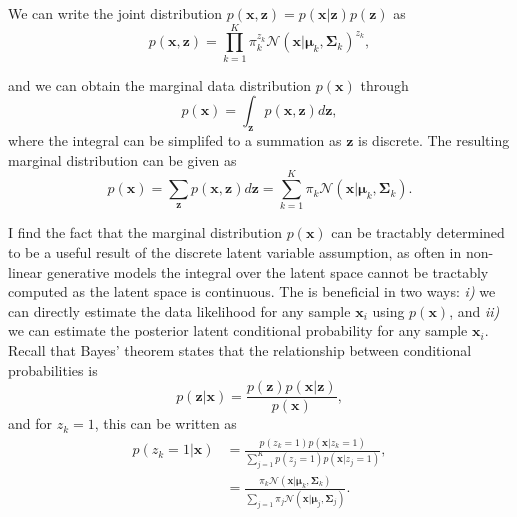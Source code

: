 \documentclass{article}
\begin{document}
We can write the joint distribution $p(\mathbf{x}, \mathbf{z}) = p(\mathbf{x}\vert\mathbf{z})p(\mathbf{z})$ as 
\begin{equation}\label{eq:joint_distribution}
p(\mathbf{x}, \mathbf{z}) = \prod_{k=1}^{K} \pi_k^{z_k} \mathcal{N}(\mathbf{x}\vert \boldsymbol\mu_k, \boldsymbol\Sigma_k)^{z_k},
\end{equation}

and we can obtain the marginal data distribution $p(\mathbf{x})$ through
\begin{equation}
p(\mathbf{x}) = \int_{\mathbf{z}}p(\mathbf{x}, \mathbf{z})d\mathbf{z},
\end{equation}
where the integral can be simplifed to a summation as $\mathbf{z}$ is discrete. The resulting marginal distribution can be given as
\begin{equation}
p(\mathbf{x}) = \sum_{\mathbf{z}}p(\mathbf{x}, \mathbf{z})d\mathbf{z} = \sum_{k=1}^{K} \pi_k \mathcal{N}(\mathbf{x}\vert \boldsymbol\mu_k, \boldsymbol\Sigma_k).
\end{equation}

I find the fact that the marginal distribution $p(\mathbf{x})$ can be tractably determined to be a useful result of the discrete latent variable assumption, as often in non-linear generative models the integral over the latent space cannot be tractably computed as the latent space is continuous. The is beneficial in two ways: \emph{i)} we can directly estimate the data likelihood for any sample $\mathbf{x}_i$ using $p(\mathbf{x})$, and \emph{ii)} we can estimate the posterior latent conditional probability for any sample $\mathbf{x}_i$. Recall that Bayes' theorem states that the relationship between conditional probabilities is
\begin{equation}\label{eq:posterior_distribution}
p(\mathbf{z} \vert \mathbf{x}) = \frac{p(\mathbf{z})p(\mathbf{x}\vert \mathbf{z})}{p(\mathbf{x})},
\end{equation}
and for $z_k = 1$, this can be written as
\begin{equation}
\begin{aligned}
p(z_k = 1 \vert \mathbf{x}) &= \frac{p(z_k = 1)p(\mathbf{x}\vert z_k = 1)}{\sum_{j=1}^{K}p(z_j = 1)p(\mathbf{x}\vert z_j = 1)}, \\
&= \frac{\pi_k\mathcal{N}(\mathbf{x}\vert \boldsymbol\mu_k, \boldsymbol\Sigma_k)}{\sum_{j=1}\pi_j\mathcal{N}(\mathbf{x}\vert \boldsymbol\mu_j, \boldsymbol\Sigma_j)}. \\
\end{aligned}
\end{equation}
\end{document}
